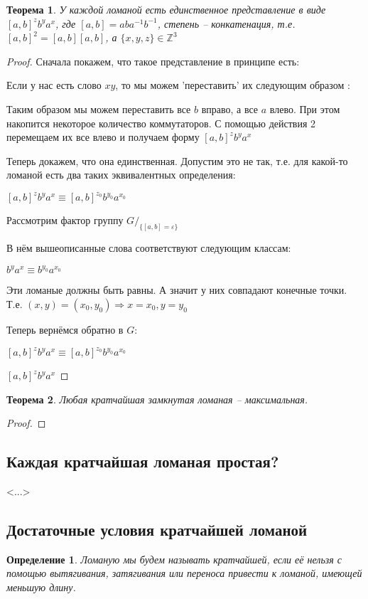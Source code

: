 \documentclass[12pt,a4paper, flushleft]{article}
\newtheorem{Def}{Определение}[section]
\newtheorem{Th}{Теорема}[section]
\begin{document}
\begin{Th}
	У каждой ломаной есть единственное представление в виде $[a, b]^zb^ya^x$, где $[a, b] = aba^{-1}b^{-1}$, степень -- конкатенация, т.е. $[a, b]^2 = [a, b][a, b]$, а $\{x, y, z\}\in\mathds{Z}^3$
\end{Th}
\begin{proof}
	Сначала покажем, что такое представление в принципе есть:
	
	Если у нас есть слово $xy$, то мы можем 'переставить' их следующим образом : %
	
	Таким образом мы можем переставить все $b$ вправо, а все $a$ влево. При этом накопится некоторое количество коммутаторов. С помощью действия 2 перемещаем их все влево и получаем форму $[a, b]^zb^ya^x$
	
	Теперь докажем, что она единственная. Допустим это не так, т.е. для какой-то ломаной есть два таких эквивалентных определения:
	
	$[a, b]^zb^ya^x\equiv [a, b]^{z_0}b^{y_0}a^{x_0}$ 
	
	Рассмотрим фактор группу $G/_{\{[a, b] = \varepsilon\}}$
	
	В нём вышеописанные слова соответствуют следующим классам:
	
	$b^ya^x\equiv b^{y_0}a^{x_0}$
	
	Эти ломаные должны быть равны. А значит у них совпадают конечные точки. Т.е. $(x, y) = (x_0, y_0)\Rightarrow x = x_0, y = y_0$
	
	Теперь вернёмся обратно в $G:$
	
	$[a, b]^zb^ya^x\equiv [a, b]^{z_0}b^{y_0}a^{x_0}$
	
	$[a, b]^zb^ya^x$
	
\end{proof}

\begin{Th}
	Любая кратчайшая замкнутая ломаная -- максимальная.
\end{Th}
\begin{proof}
	
		
\end{proof}

\subsection{Каждая кратчайшая ломаная простая?}
	<...>
\subsection{Достаточные условия кратчайшей ломаной}
\begin{Def}
Ломаную мы будем называть кратчайшей, если её нельзя с помощью вытягивания, затягивания
или переноса привести к ломаной, имеющей меньшую длину.
\end{Def}
\end{document}
